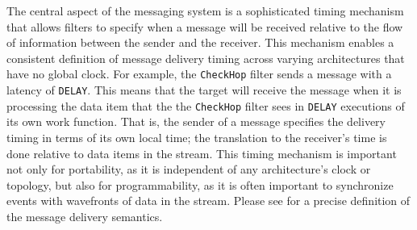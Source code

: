 \documentclass{sig-alternate}
\begin{document}
The central aspect of the messaging system is a sophisticated timing
mechanism that allows filters to specify when a message will be
received relative to the flow of information between the sender and
the receiver.  This mechanism enables a consistent definition of
message delivery timing across varying architectures that have no
global clock.  For example, the {\tt CheckHop} filter sends a
message with a latency of {\tt DELAY}.  This means that the target
will receive the message when it is processing the data item that the
the {\tt CheckHop} filter sees in {\tt DELAY} executions of its
own work function.  That is, the sender of a message specifies the
delivery timing in terms of its own local time; the translation to the
receiver's time is done relative to data items in the stream.  This
timing mechanism is important not only for portability, as it is
independent of any architecture's clock or topology, but also for
programmability, as it is often important to synchronize events with
wavefronts of data in the stream.  Please see \cite{streamittech} for
a precise definition of the message delivery semantics.


\end{document}
